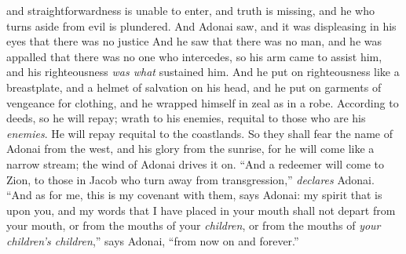 \begin{biblechapter}
and straightforwardness is unable to enter,
\verse and truth is missing, 
and he who turns aside from evil is plundered. 
And Adonai saw, 
and it was displeasing in his eyes that there was no justice
\verse And he saw that there was no man, 
and he was appalled that there was no one who intercedes, 
so his arm came to assist him, 
and his righteousness \textit{was what} sustained him.
\verse And he put on righteousness like a breastplate, 
and a helmet of salvation on his head, 
and he put on garments of vengeance for clothing, 
and he wrapped himself in zeal as in a robe.
\verse According to deeds, so he will repay; 
wrath to his enemies, requital to those who are his \textit{enemies}. 
He will repay requital to the coastlands.
\verse So they shall fear the name of Adonai from the west, 
and his glory from the sunrise, 
for he will come like a narrow stream; 
the wind of Adonai drives it on.
\verse “And a redeemer will come to Zion, 
to those in Jacob who turn away from transgression,” \textit{declares} Adonai.
\verse “And as for me, this is my covenant with them, says Adonai: my spirit that is upon you, 
and my words that I have placed in your mouth 
shall not depart from your mouth, 
or from the mouths of your \textit{children}, 
or from the mouths of \textit{your children’s children},” 
says Adonai, “from now on and forever.”
\end{biblechapter}

